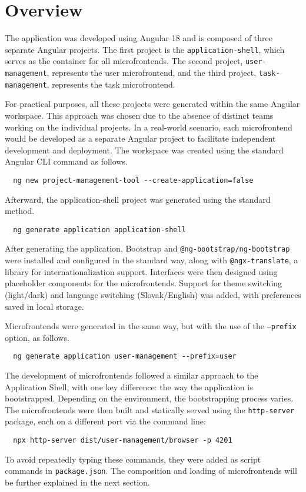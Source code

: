 \section{Overview}
The application was developed using Angular 18 and is composed of three separate Angular projects. The first project is the \texttt{application-shell}, which serves as the container for all microfrontends. The second project, \texttt{user-management}, represents the user microfrontend, and the third project, \texttt{task-management}, represents the task microfrontend.

For practical purposes, all these projects were generated within the same Angular workspace. This approach was chosen due to the absence of distinct teams working on the individual projects. In a real-world scenario, each microfrontend would be developed as a separate Angular project to facilitate independent development and deployment. The workspace was created using the standard Angular CLI command as follows.
\begin{lstlisting}
  ng new project-management-tool --create-application=false
\end{lstlisting}
Afterward, the application-shell project was generated using the standard method.
\begin{lstlisting}
  ng generate application application-shell
\end{lstlisting}
After generating the application, Bootstrap and \texttt{@ng-bootstrap/ng-bootstrap} were installed and configured in the standard way, along with \texttt{@ngx-translate}, a library for internationalization support. Interfaces were then designed using placeholder components for the microfrontends. Support for theme switching (light/dark) and language switching (Slovak/English) was added, with preferences saved in local storage.

Microfrontends were generated in the same way, but with the use of the \texttt{--prefix} option, as follows.
\begin{lstlisting}
  ng generate application user-management --prefix=user
\end{lstlisting}
The development of microfrontends followed a similar approach to the Application Shell, with one key difference: the way the application is bootstrapped. Depending on the environment, the bootstrapping process varies. The microfrontends were then built and statically served using the \texttt{http-server} package, each on a different port via the command line:
\begin{lstlisting}
  npx http-server dist/user-management/browser -p 4201
\end{lstlisting}
To avoid repeatedly typing these commands, they were added as script commands in \texttt{package.json}. The composition and loading of microfrontends will be further explained in the next section.

